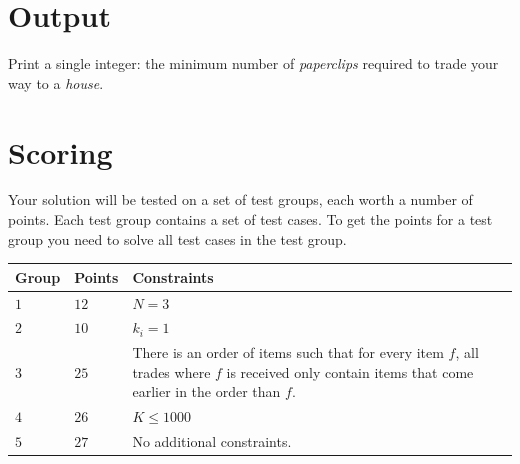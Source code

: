 \section*{Output}
Print a single integer: the minimum number of \emph{paperclips} required to trade your way to a \emph{house}.

\section*{Scoring}
Your solution will be tested on a set of test groups, each worth a number of points. Each test group contains
a set of test cases. To get the points for a test group you need to solve all test cases in the test group.

\noindent
\begin{tabular}{| l | l | p{12cm} |}
  \hline
  \textbf{Group} & \textbf{Points} & \textbf{Constraints} \\ \hline
  $1$ & $12$ & $N = 3$ \\ \hline
  $2$ & $10$ & $k_i = 1$ \\ \hline
  $3$ & $25$ & There is an order of items such that for every item
  $f$, all trades where $f$ is received only contain items that come earlier in the order than $f$. \\ \hline
  $4$ & $26$ & $K \leq 1000$ \\ \hline
  $5$ & $27$ & No additional constraints. \\ \hline
\end{tabular}
